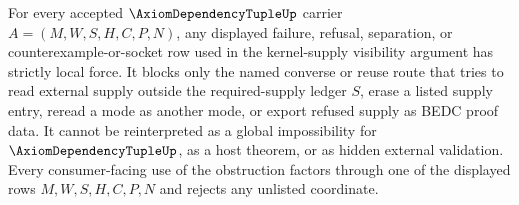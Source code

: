 \begin{corollary}
\label{cor:axiom-dependency-tuple-kernel-supply-visibility-strict-obstruction}
For every accepted $\AxiomDependencyTupleUp$ carrier
$A=(M,W,S,H,C,P,N)$, any displayed failure, refusal, separation, or
counterexample-or-socket row used in the kernel-supply visibility argument has
strictly local force. It blocks only the named converse or reuse route that
tries to read external supply outside the required-supply ledger $S$, erase a
listed supply entry, reread a mode as another mode, or export refused supply as
BEDC proof data. It cannot be reinterpreted as a global impossibility for
$\AxiomDependencyTupleUp$, as a host theorem, or as hidden external validation.
Every consumer-facing use of the obstruction factors through one of the
displayed rows $M,W,S,H,C,P,N$ and rejects any unlisted coordinate.
\end{corollary}
